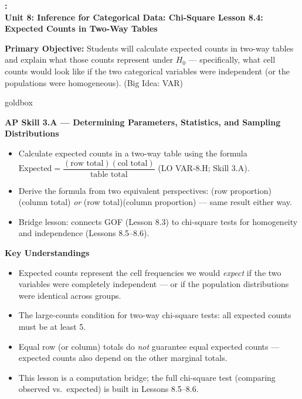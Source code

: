 \documentclass[10pt]{article}
\newcommand{\UnitNumberName}{Unit 8: Inference for Categorical Data: Chi-Square \quad}
\newcommand{\LessonNumberName}{Lesson 8.4: Expected Counts in Two-Way Tables}
\begin{document}
\begin{center}
    {\Large\bfseries \CourseName: \SchoolYear \\
    {\small\bfseries \UnitNumberName \LessonNumberName}}
\end{center}

\begin{tcolorbox}[colback=sky, colframe=navy, boxrule=0.9pt, arc=2mm,
    left=2mm, right=2mm, top=1.5mm, bottom=1.5mm]
    \textbf{Primary Objective:} Students will calculate expected counts in two-way tables
    and explain what those counts represent under $H_0$ --- specifically, what cell counts
    would look like if the two categorical variables were independent (or the populations
    were homogeneous). (Big Idea: VAR)
\end{tcolorbox}

\renewcommand{\arraystretch}{1.6}
\begin{skillbox}{goldbox}
\begin{minipage}[t]{0.48\linewidth}
    \textbf{AP Skill 3.A --- Determining Parameters, Statistics, and Sampling Distributions}
    \begin{itemize}
        \item Calculate expected counts in a two-way table using the formula
              $\text{Expected} = \dfrac{(\text{row total})(\text{col total})}{\text{table total}}$
              (LO VAR-8.H; Skill 3.A).
        \item Derive the formula from two equivalent perspectives:
              (row proportion)(column total) \emph{or} (row total)(column proportion) ---
              same result either way.
        \item Bridge lesson: connects GOF (Lesson 8.3) to chi-square tests for
              homogeneity and independence (Lessons 8.5--8.6).
    \end{itemize}
\end{minipage}
\hfill
\begin{minipage}[t]{0.48\linewidth}
    \textbf{Key Understandings}
    \begin{itemize}
        \item Expected counts represent the cell frequencies we would \emph{expect} if the
              two variables were completely independent --- or if the population distributions
              were identical across groups.
        \item The large-counts condition for two-way chi-square tests: all expected counts
              must be at least 5.
        \item Equal row (or column) totals do \emph{not} guarantee equal expected counts ---
              expected counts also depend on the other marginal totals.
        \item This lesson is a computation bridge; the full chi-square test (comparing
              observed vs.\ expected) is built in Lessons 8.5--8.6.
    \end{itemize}
\end{minipage}
\end{skillbox}
\end{document}
